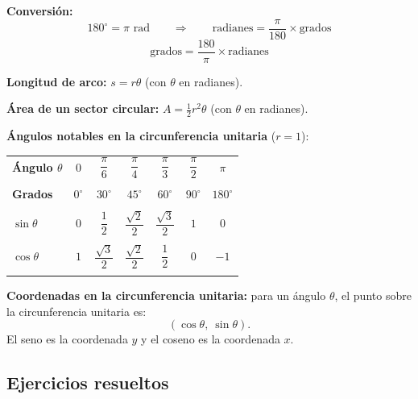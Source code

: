 \documentclass[12pt, letterpaper]{article}
\begin{document}
\begin{cuadroteoria}
  \textbf{Conversión:}
  $$180^\circ = \pi \text{ rad} \qquad\Longrightarrow\qquad \text{radianes} = \frac{\pi}{180} \times \text{grados}$$
  $$\text{grados} = \frac{180}{\pi} \times \text{radianes}$$

  \textbf{Longitud de arco:} $s = r\theta$ (con $\theta$ en radianes).

  \textbf{Área de un sector circular:} $A = \frac{1}{2}r^2 \theta$ (con $\theta$ en radianes).
\end{cuadroteoria}
\newpage
\begin{cuadrosolucion}
  \textbf{Ángulos notables en la circunferencia unitaria} ($r = 1$):

  \begin{center}
    \begin{tabular}{lcccccc}
      \toprule
      \textbf{Ángulo $\theta$} & $0$       & $\dfrac{\pi}{6}$      & $\dfrac{\pi}{4}$      & $\dfrac{\pi}{3}$      & $\dfrac{\pi}{2}$ & $\pi$       \\\\
      \textbf{Grados}          & $0^\circ$ & $30^\circ$            & $45^\circ$            & $60^\circ$            & $90^\circ$       & $180^\circ$ \\\\
      \midrule
      $\sin\theta$             & $0$       & $\dfrac{1}{2}$        & $\dfrac{\sqrt{2}}{2}$ & $\dfrac{\sqrt{3}}{2}$ & $1$              & $0$         \\\\
      $\cos\theta$             & $1$       & $\dfrac{\sqrt{3}}{2}$ & $\dfrac{\sqrt{2}}{2}$ & $\dfrac{1}{2}$        & $0$              & $-1$        \\\\
      \bottomrule
    \end{tabular}
  \end{center}
\end{cuadrosolucion}

\begin{cuadroadvertencia}
  \textbf{Coordenadas en la circunferencia unitaria:} para un ángulo $\theta$, el punto sobre la circunferencia unitaria es:
  $$(\cos\theta,\ \sin\theta).$$
  El seno es la coordenada $y$ y el coseno es la coordenada $x$.
\end{cuadroadvertencia}

\subsection{Ejercicios resueltos}
\end{document}
